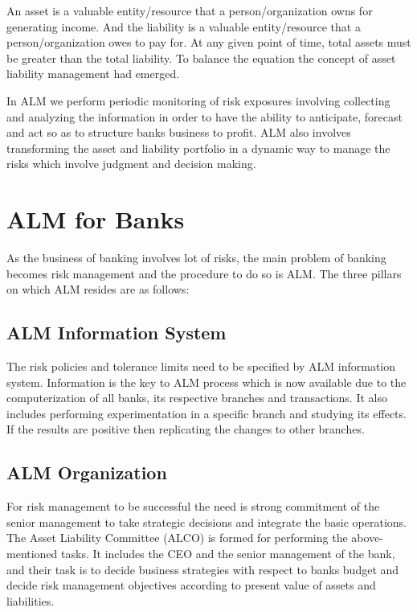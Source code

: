 	An asset is a valuable entity/resource that a person/organization owns for generating income.  And the liability is a valuable entity/resource that a person/organization owes to pay for. At any given point of time, total assets must be greater than the total liability. To balance the equation the concept of asset liability management \cite{11} had emerged. 

	In ALM we perform periodic monitoring of risk exposures involving collecting and analyzing the information in order to have the ability to anticipate, forecast and act so as to structure banks business to profit. ALM also involves transforming the asset and liability portfolio in a dynamic way to manage the risks which involve judgment and decision making.



	
\section{ALM for Banks}

	As the business of banking involves lot of risks, the main problem of banking becomes risk management and the procedure to do so is ALM. The three pillars on which ALM resides are as follows:

	\subsection{ALM Information System}
		The risk policies and tolerance limits need to be specified by ALM information system. Information is the key to ALM process which is now available due to the computerization of all banks, its respective branches and transactions. It also includes performing experimentation in a specific branch and studying its effects. If the results are positive then replicating the changes to other branches.

	\subsection{ALM Organization}
		For risk management to be successful the need is strong commitment of the senior management to take strategic decisions and integrate the basic operations. The Asset Liability Committee (ALCO) is formed for performing the above-mentioned tasks. It includes the CEO and the senior management of the bank, and their task is to decide business strategies with respect to banks budget and decide risk management objectives according to present value of assets and liabilities. 

